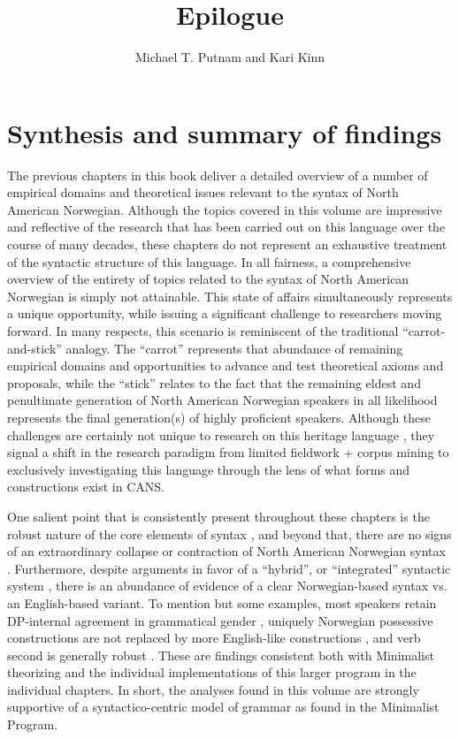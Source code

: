 \documentclass[output=paper,colorlinks,citecolor=brown]{langscibook}
\author{Michael T. Putnam\orcid{}\affiliation{Penn State University} and Kari Kinn\orcid{}\affiliation{University of Bergen}}
\title{Epilogue}
\begin{document}
\maketitle

\section{Synthesis and summary of findings}

The previous chapters in this book deliver a detailed overview of a number of empirical domains and theoretical issues  relevant to the syntax of North American Norwegian. Although the topics covered in this volume are impressive and reflective of the research that has been carried out on this language over the course of many decades, these chapters do not represent an exhaustive treatment of the syntactic structure of this language. In all fairness, a comprehensive overview of the entirety of topics related to the syntax of North American Norwegian is simply not attainable. This state of affairs simultaneously represents a unique opportunity, while issuing a significant challenge to researchers moving forward. In many respects, this scenario is reminiscent of the traditional “carrot-and-stick” analogy. The “carrot” represents that abundance of remaining empirical domains and opportunities to advance and test theoretical axioms and proposals, while the “stick” relates to the fact that the remaining eldest and penultimate generation of North American Norwegian speakers in all likelihood represents the final generation(s) of highly proficient speakers. Although these challenges are certainly not unique to research on this heritage language \citep{DAlessandro2021}, they signal a shift in the research paradigm from limited fieldwork + corpus mining to exclusively investigating this language through the lens of what forms and constructions exist in CANS. 

One salient point that is consistently present throughout these chapters is the robust nature of the core elements of syntax \citep{Lohndal2021}, and beyond that, there are no signs of an extraordinary collapse or contraction of North American Norwegian syntax \citep{Bousquette2020}. Furthermore, despite arguments in favor of a “hybrid”, or “integrated” syntactic system \citep{Aboh2015,PutnamCarlsonReitter2018}, there is an abundance of evidence of a clear Norwegian-based syntax vs. an English-based variant. To mention but some examples, most speakers retain DP-internal agreement in grammatical gender , uniquely Norwegian possessive constructions are not replaced by more English-like constructions , and verb second is generally robust . These are findings consistent both with Minimalist theorizing and the individual implementations of this larger program in the individual chapters. In short, the analyses found in this volume are strongly supportive of a syntactico-centric model of grammar as found in the Minimalist Program. 
\end{document}
